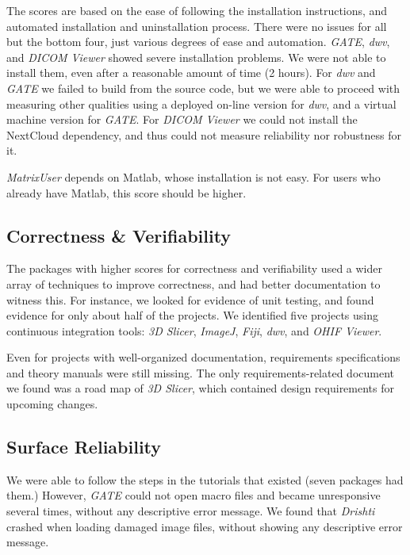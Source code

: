 \documentclass[final, 12pt, 3p, times]{elsarticle}
\begin{document}
The scores are based on the ease of following the installation instructions,
and automated installation and uninstallation process. There were no issues
for all but the bottom four, just various degrees of ease and automation.
\textit{GATE}, \textit{dwv}, and \textit{DICOM Viewer} showed severe
installation problems. We were not able to install them, even after a reasonable
amount of time (2 hours).  For \textit{dwv} and \textit{GATE} we failed to build
from the source code, but we were able to proceed with measuring other qualities
using a deployed on-line version for \textit{dwv}, and a virtual machine version for
\textit{GATE}. For \textit{DICOM Viewer} we could not install the NextCloud
dependency, and thus could not measure reliability nor robustness for it.

\textit{MatrixUser} depends on Matlab, whose installation is not easy.
For users who already have Matlab, this score should be higher.

\subsection{Correctness \& Verifiability} \label{sec_result_correctness_verifiability}

The packages with higher scores for correctness and verifiability used a wider array of
techniques to improve correctness, and had better documentation to witness this.
For instance, we looked for evidence of unit testing, and found evidence for
only about half of the projects. We identified five projects using continuous
integration tools: \textit{3D Slicer}, \textit{ImageJ}, \textit{Fiji},
\textit{dwv}, and \textit{OHIF Viewer}. 

Even for projects with well-organized documentation, requirements
specifications and theory manuals were still missing.
The only requirements-related document we found was a road
map of \textit{3D Slicer}, which contained design requirements for upcoming
changes.

\subsection{Surface Reliability} \label{sec_result_reliability}

We were able to follow the steps in the tutorials that existed (seven packages
had them.) However, \textit{GATE} could not open macro files and became
unresponsive several times, without any descriptive error message. We found that
\textit{Drishti} crashed when loading damaged image files, without showing any
descriptive error message.
\end{document}
